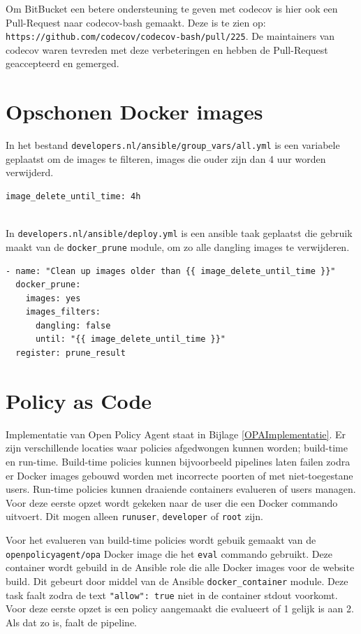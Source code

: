 Om BitBucket een betere ondersteuning te geven met codecov is hier ook een Pull-Request naar codecov-bash gemaakt. Deze is te zien op:\\ \texttt{https://github.com/codecov/codecov-bash/pull/225}. De maintainers van codecov waren tevreden met deze verbeteringen en hebben de Pull-Request geaccepteerd en gemerged.

\section{Opschonen Docker images}
In het bestand \texttt{developers.nl/ansible/group\_vars/all.yml} is een variabele geplaatst om de images te filteren, images die ouder zijn dan 4 uur worden verwijderd.
\begin{verbatim}
image_delete_until_time: 4h
\end{verbatim}
\\In \texttt{developers.nl/ansible/deploy.yml} is een ansible taak geplaatst die gebruik maakt van de \texttt{docker\_prune} module, om zo alle dangling images te verwijderen.
\begin{verbatim}
- name: "Clean up images older than {{ image_delete_until_time }}"
  docker_prune:
    images: yes
    images_filters:
      dangling: false
      until: "{{ image_delete_until_time }}"
  register: prune_result
\end{verbatim}

\section{Policy as Code}

Implementatie van Open Policy Agent staat in Bijlage \ref{OPAImplementatie}. Er zijn verschillende locaties waar policies afgedwongen kunnen worden; build-time en run-time. Build-time policies kunnen bijvoorbeeld pipelines laten failen zodra er Docker images gebouwd worden met incorrecte poorten of met niet-toegestane users. Run-time policies kunnen draaiende containers evalueren of users managen. Voor deze eerste opzet wordt gekeken naar de user die een Docker commando uitvoert. Dit mogen alleen \texttt{runuser}, \texttt{developer} of \texttt{root} zijn. 

Voor het evalueren van build-time policies wordt gebuik gemaakt van de \texttt{openpolicyagent/opa} Docker image die het \texttt{eval} commando gebruikt. Deze container wordt gebuild in de Ansible role die alle Docker images voor de website build. Dit gebeurt door middel van de Ansible \texttt{docker\_container} module. Deze task faalt zodra de text \texttt{"allow": true} niet in de container stdout voorkomt. Voor deze eerste opzet is een policy aangemaakt die evalueert of 1 gelijk is aan 2. Als dat zo is, faalt de pipeline.

